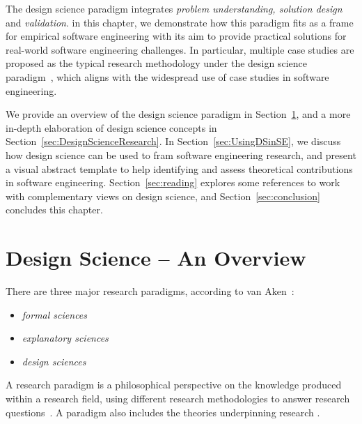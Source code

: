 \documentclass[graybox]{svmult}
\begin{document}
The design science paradigm integrates \emph{problem understanding, solution design} and \emph{validation}. in this chapter, we demonstrate how this paradigm fits as a frame for empirical software engineering with its aim to provide practical solutions for real-world software engineering challenges. In particular, multiple case studies are proposed as the typical research methodology under the design science paradigm~\cite{van_aken_management_2004}, which aligns with the widespread use of case studies in software engineering. 

We provide an overview of the design science paradigm in Section~\ref{sec:overview}, and a more in-depth elaboration of design science concepts in Section~\ref{sec:DesignScienceResearch}. In Section~\ref{sec:UsingDSinSE}, we discuss how  design science can be used to fram software engineering research, and present a visual abstract template to help identifying and assess theoretical contributions in software engineering. Section~\ref{sec:reading} explores some references to work with complementary views on design science, and Section~\ref{sec:conclusion} concludes this chapter.


\section{Design Science -- An Overview}
\label{sec:overview}


There are three major research paradigms, according to van Aken~\cite{van_aken_management_2004}:
\begin{itemize}
\item \emph{formal sciences} %
\item \emph{explanatory sciences} %
\item \emph{design sciences}%
\end{itemize}

A research paradigm is a philosophical perspective on the knowledge produced within a research field, using different research methodologies to answer research questions~\cite{van_aken_management_2004}. A  paradigm  also includes the theories underpinning research \cite{Kuhn?}. 
\end{document}
